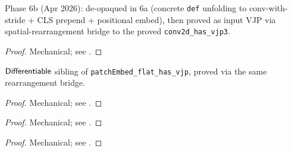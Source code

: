 \begin{theorem}
  \label{ax:patchEmbed_flat_has_vjp}
  \leanok
  Phase 6b (Apr 2026): de-opaqued in 6a (concrete \texttt{def}
  unfolding to conv-with-stride + CLS prepend + positional embed),
  then proved as input VJP via spatial-rearrangement bridge to the
  proved \texttt{conv2d\_has\_vjp3}.
\end{theorem}

\begin{proof}
\leanok
Mechanical; see .
\end{proof}

\begin{theorem}
  \label{ax:patchEmbed_flat_diff}
  \leanok
  \(\mathsf{Differentiable}\) sibling of
  \texttt{patchEmbed\_flat\_has\_vjp}, proved via the same
  rearrangement bridge.
\end{theorem}

\begin{proof}
\leanok
Mechanical; see .
\end{proof}

\begin{theorem}
  \label{thm:layerNorm_per_token_has_vjp_mat}
  \leanok
\end{theorem}

\begin{proof}
\leanok
Mechanical; see .
\end{proof}

\begin{theorem}
  \label{thm:dense_per_token_has_vjp_mat}
  \leanok
\end{theorem}

\begin{proof}
\leanok
Mechanical; see .
\end{proof}

\begin{theorem}
  \label{thm:gelu_per_token_has_vjp_mat}
  \leanok
\end{theorem}

